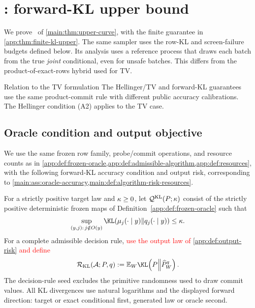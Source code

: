 \section{\KLCaseTitle: forward-KL upper bound}
\label{app:kl-extension}

We prove \KLCase\ of \cref{main:thm:upper-curve}, with the finite
guarantee in \cref{app:thm:finite-kl-upper}.
The same sampler uses the row-KL and screen-failure budgets defined below.
Its analysis uses a reference process that draws each batch from the true
\emph{joint} conditional, even for unsafe batches.
This differs from the product-of-exact-rows hybrid used for TV.

\begin{proposalcontext}{Relation to the TV formulation}
The Hellinger/TV and forward-KL guarantees use the same product-commit rule
with different public accuracy calibrations.  The Hellinger condition (A2)
applies to the TV case.
\end{proposalcontext}

\subsection{Oracle condition and output objective}
\label{app:kl-setup}

We use the same frozen row family, probe/commit operations, and resource
counts as in
\textcolor{red}{\cref{app:def:frozen-oracle,app:def:admissible-algorithm,app:def:resources}},
with the following forward-KL accuracy condition and output risk, corresponding
to \cref{main:ass:oracle-accuracy,main:def:algorithm-risk-resources}.

\begin{definition}
\label{app:def:kl-oracle-risk}
For a strictly positive target law and $\kappa\ge0$, let
$\mathcal Q^{\mathrm{KL}}(P;\kappa)$ consist of the strictly positive
deterministic frozen maps of Definition~\ref{app:def:frozen-oracle} such that
\begin{equation}
 \sup_{(y,j):\,j\notin\ObservedSet{y}}
 \KLDivergence{\ExactRow{y}{j}}{\OracleRow{y}{j}}
 \le\KLRowBudget.
 \label{app:eq:kl-row-condition}
\end{equation}
For a complete admissible decision rule,
\textcolor{red}{use the output law of \cref{app:def:output-risk} and define}
\begin{equation}
 \KLSeedRisk(\mathcal A;\TargetLaw,\FrozenOracle)
 :=\mathbb E_{\ControllerSeed}
   \KLDivergence{\TargetLaw}
     {\SamplerOutputLaw{\ControllerSeed}{\FrozenOracle}}.
 \label{app:eq:kl-seed-risk}
\end{equation}
The decision-rule seed excludes the primitive randomness used to draw commit
values.  All KL divergences use natural logarithms and the displayed forward
direction: target or exact conditional first, generated law or oracle second.
\end{definition}

